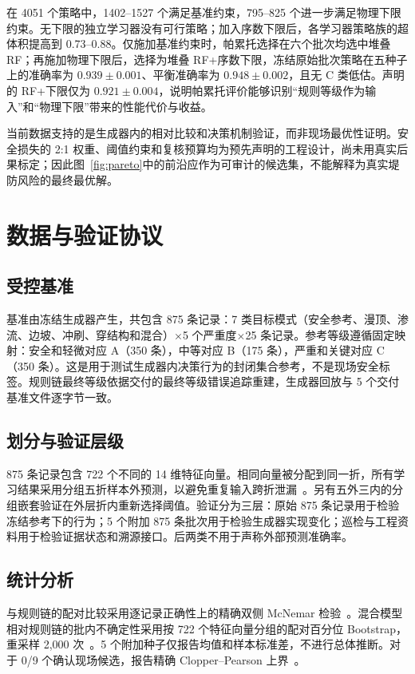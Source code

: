 \documentclass[10pt,twocolumn,a4paper]{ctexart}
\begin{document}
在 4051 个策略中，1402--1527 个满足基准约束，795--825 个进一步满足物理下限约束。无下限的独立学习器没有可行策略；加入序数下限后，各学习器策略族的超体积提高到 0.73--0.88。仅施加基准约束时，帕累托选择在六个批次均选中堆叠 RF；再施加物理下限后，选择为堆叠 RF+序数下限，冻结原始批次策略在五种子上的准确率为 \(0.939\pm0.001\)、平衡准确率为 \(0.948\pm0.002\)，且无 C 类低估。声明的 RF+下限仅为 \(0.921\pm0.004\)，说明帕累托评价能够识别“规则等级作为输入”和“物理下限”带来的性能代价与收益。

当前数据支持的是生成器内的相对比较和决策机制验证，而非现场最优性证明。安全损失的 2:1 权重、阈值约束和复核预算均为预先声明的工程设计，尚未用真实后果标定；因此图~\ref{fig:pareto}中的前沿应作为可审计的候选集，不能解释为真实堤防风险的最终最优解。

\section{数据与验证协议}
\subsection{受控基准}
基准由冻结生成器产生，共包含 875 条记录：7 类目标模式（安全参考、漫顶、渗流、边坡、冲刷、穿结构和混合）$\times$5 个严重度$\times$25 条记录。参考等级遵循固定映射：安全和轻微对应 A（350 条），中等对应 B（175 条），严重和关键对应 C（350 条）。这是用于测试生成器内决策行为的封闭集合参考，不是现场安全标签。规则链最终等级依据交付的最终等级错误追踪重建，生成器回放与 5 个交付基准文件逐字节一致。

\subsection{划分与验证层级}
875 条记录包含 722 个不同的 14 维特征向量。相同向量被分配到同一折，所有学习结果采用分组五折样本外预测，以避免重复输入跨折泄漏~\cite{Kaufman2012,Roberts2017}。另有五外三内的分组嵌套验证在外层折内重新选择阈值。验证分为三层：原始 875 条记录用于检验冻结参考下的行为；5 个附加 875 条批次用于检验生成器实现变化；巡检与工程资料用于检验证据状态和溯源接口。后两类不用于声称外部预测准确率。

\subsection{统计分析}
与规则链的配对比较采用逐记录正确性上的精确双侧 McNemar 检验~\cite{McNemar1947,Dietterich1998}。混合模型相对规则链的批内不确定性采用按 722 个特征向量分组的配对百分位 Bootstrap，重采样 2,000 次~\cite{Efron1993}。5 个附加种子仅报告均值和样本标准差，不进行总体推断。对于 0/9 个确认现场候选，报告精确 Clopper--Pearson 上界~\cite{Clopper1934}。
\end{document}
